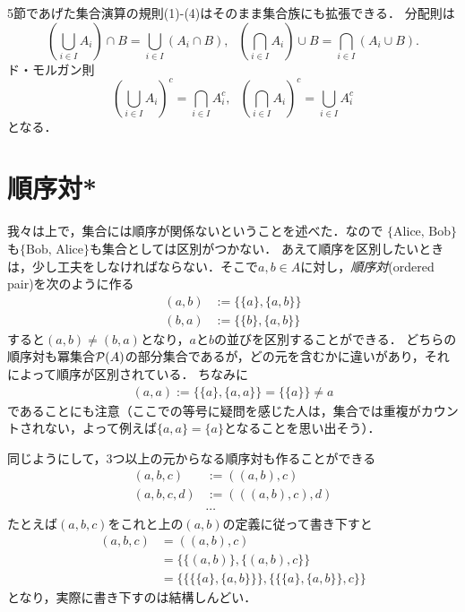 \documentclass[11pt,a4paper]{jsarticle}
\begin{document}
5節であげた集合演算の規則(1)-(4)はそのまま集合族にも拡張できる．
分配則は
\[
 \left( \bigcup_{i \in I} A_i \right) \cap B = \bigcup_{i \in I} \left( A_i  \cap B \right) , \ \ \ 
 \left( \bigcap_{i \in I} A_i \right) \cup B = \bigcap_{i \in I} \left( A_i  \cup B \right). 
\]
ド・モルガン則
\[
 \left( \bigcup_{i \in I} A_i \right)^c = \bigcap_{i \in I} A_i^c, \ \ \ 
 \left( \bigcap_{i \in I} A_i \right)^c = \bigcup_{i \in I} A_i^c
\]
となる．





\section{順序対*}
我々は上で，集合には順序が関係ないということを述べた．なので $\{\text{Alice, Bob}\}$も$\{\text{Bob, Alice}\}$も集合としては区別がつかない．
あえて順序を区別したいときは，少し工夫をしなければならない．そこで$a, b \in A$に対し，\emph{順序対}(ordered pair)を次のように作る
\begin{align*}
 (a, b) &:= \{ \{a\}, \{a, b\} \} \\
 (b, a) &:= \{ \{b\}, \{a, b\} \} 
\end{align*}
すると$(a,b) \neq (b,a)$となり，$a$と$b$の並びを区別することができる．
どちらの順序対も冪集合$\mathcal{P}(A)$の部分集合であるが，どの元を含むかに違いがあり，それによって順序が区別されている．
ちなみに
\begin{align*}
 (a, a) := \{ \{a\}, \{a, a\} \} = \{ \{a\} \} \neq a 
\end{align*}
であることにも注意（ここでの等号に疑問を感じた人は，集合では重複がカウントされない，よって例えば$\{a, a\} = \{a\}$となることを思い出そう）．

同じようにして，3つ以上の元からなる順序対も作ることができる
\begin{align*}
 (a, b, c) &:= ((a,b), c) \\
 (a, b, c, d) &:= (((a,b), c), d) \\
&\cdots
\end{align*}
たとえば$ (a, b, c)$をこれと上の$(a,b)$の定義に従って書き下すと
\begin{align*}
 (a, b, c)  &= ((a,b), c) \\
            &= \{ \{ (a,b) \}, \{ (a,b), c \} \} \\
            &= \{\{\{\{a\}, \{a,b\}\}\}, \{\{\{a\}, \{a,b\}\}, c\}\} 
\end{align*}
となり，実際に書き下すのは結構しんどい．
\end{document}
